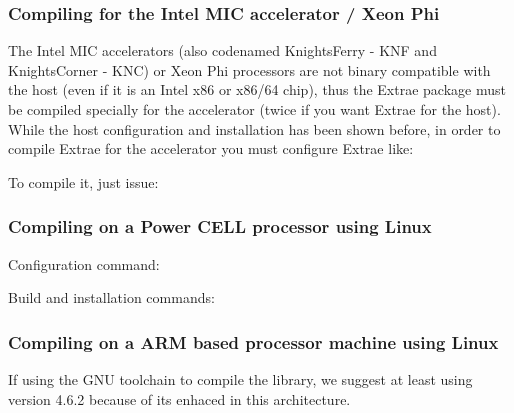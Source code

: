 \subsubsection{Compiling for the Intel MIC accelerator / Xeon Phi}

The Intel MIC accelerators (also codenamed KnightsFerry - KNF and KnightsCorner - KNC) or Xeon Phi processors are not binary compatible with the host (even if it is an Intel x86 or x86/64 chip), thus the Extrae package must be compiled specially for the accelerator (twice if you want Extrae for the host). While the host configuration and installation has been shown before, in order to compile Extrae for the accelerator you must configure Extrae like:


To compile it, just issue:


\subsubsection{Compiling on a Power CELL processor using Linux}

Configuration command:


Build and installation commands:


\subsubsection{Compiling on a ARM based processor machine using Linux}

If using the GNU toolchain to compile the library, we suggest at least using version 4.6.2 because of its enhaced in this architecture.

